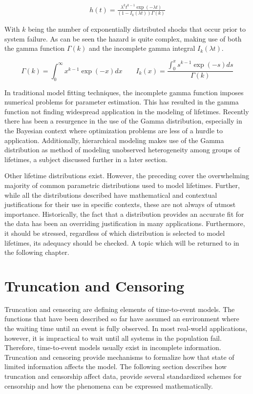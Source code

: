 \begin{align*}
h(t) = \frac{\lambda^k t^{k-1} \exp(-\lambda t)}{(1 - I_k(\lambda t)) \Gamma(k)} \tag{$ k>0, \lambda > 0 $}
\end{align*}

With $k$ being the number of exponentially distributed shocks that occur prior to system failure. As can be seen the hazard is quite complex, making use of both the gamma function $\Gamma(k)$ and the incomplete gamma integral $I_k(\lambda t)$.

$$ \Gamma(k) = \int_0^\infty x^{k-1} \exp(-x) dx \qquad I_k(x) = \frac{\int_0^x s^{k-1} \exp(-s) ds}{\Gamma(k)} $$

In traditional model fitting techniques, the incomplete gamma function imposes numerical problems for parameter estimation\cite{Wienke2010}. This has resulted in the gamma function not finding widespread application in the modeling of lifetimes. Recently there has been a resurgence in the use of the Gamma distribution, especially in the Bayesian context where optimization problems are less of a hurdle to application. Additionally, hierarchical modeling makes use of the Gamma distribution as method of modeling unobserved heterogeneity among groups of lifetimes, a subject discussed further in a later section.


Other lifetime distributions exist. However, the preceding cover the overwhelming majority of common parametric distributions used to model lifetimes. Further, while all the distributions described have mathematical and contextual justifications for their use in specific contexts, these are not always of utmost importance. Historically, the fact that a distribution provides an accurate fit for the data has been an overriding justification in many applications\cite{Marshall2007}. Furthermore, it should be stressed, regardless of which distribution is selected to model lifetimes, its adequacy should be checked. A topic which will be returned to in the following chapter.


\section*{Truncation and Censoring}

Truncation and censoring are defining elements of time-to-event models. The functions that have been described so far have assumed an environment where the waiting time until an event is fully observed. In most real-world applications, however, it is impractical to wait until all systems in the population fail. Therefore, time-to-event models usually exist in incomplete information. Truncation and censoring provide mechanisms to formalize how that state of limited information affects the model. The following section describes how truncation and censorship affect data, provide several standardized schemes for censorship and how the phenomena can be expressed mathematically.

